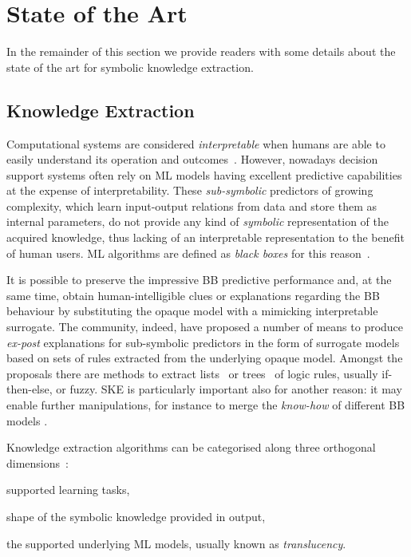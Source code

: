\documentclass[
]{ceurart}
\begin{document}
\section{State of the Art}

In the remainder of this section we provide readers with some details about the state of the art for symbolic knowledge extraction. %

\subsection{Knowledge Extraction}

Computational systems are considered \emph{interpretable} when humans are able to easily understand its operation and outcomes~\cite{agentbasedxai-aamas2020}.
%
However, nowadays decision support systems often rely on ML models having excellent predictive capabilities at the expense of interpretability.
%
These \emph{sub-symbolic} predictors of growing complexity, which learn input-output relations from data and store them as internal parameters, do not provide any kind of \emph{symbolic} representation of the acquired knowledge, thus lacking of an interpretable representation to the benefit of human users.
%
ML algorithms are defined as \emph{black boxes} for this reason~\cite{Lipton2018}.

It is possible to preserve the impressive BB predictive performance and, at the same time, obtain human-intelligible clues or explanations regarding the BB behaviour by substituting the opaque model with a mimicking interpretable surrogate.
%
The \xai{} community, indeed, have proposed a number of means to produce \emph{ex-post} explanations for sub-symbolic predictors in the form of surrogate models based on sets of rules extracted from the underlying opaque model.
%
Amongst the proposals there are methods to extract lists~\cite{craven1994using,huysmans2006iter,gridex-extraamas2021} or trees~\cite{craven1996extracting,breiman1984classification} of logic rules, usually if-then-else, \mofn{} or fuzzy.
%
SKE is particularly important also for another reason: it may enable further manipulations, for instance to merge the \emph{know-how} of different BB models \cite{xmas-aiiot2019}.

Knowledge extraction algorithms can be categorised along three orthogonal dimensions~\cite{xaisurvey-ia14}:
%
\begin{inlinelist}
    \item\label{item:category:learning-task} supported learning tasks,
    \item\label{item:category:knowledge-form} shape of the symbolic knowledge provided in output,
    \item\label{item:category:translucency} the supported underlying ML models, usually known as \emph{translucency}.
\end{inlinelist}
\end{document}
